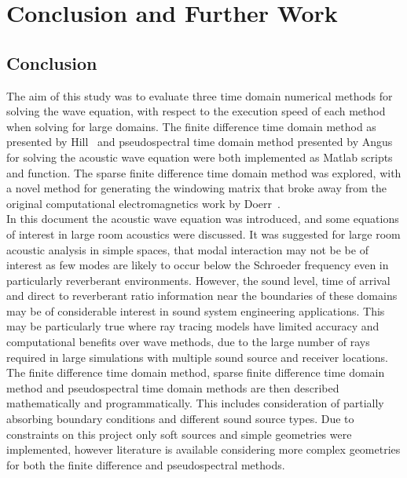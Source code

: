 %
%
%
\chapter{Conclusion and Further Work}
\section{Conclusion}
The aim of this study was to evaluate three time domain numerical methods for solving the wave equation, with respect to the execution speed of each method when solving for large domains. The finite difference time domain method as presented by Hill~\cite{Hill2012} and pseudospectral time domain method presented by Angus~\cite{Angus2010} for solving the acoustic wave equation were both implemented as Matlab scripts and function. The sparse finite difference time domain method was explored, with a novel method for generating the windowing matrix that broke away from the original computational electromagnetics work by Doerr~\cite{Doerr2013}.\\

In this document the acoustic wave equation was introduced, and some equations of interest in large room acoustics were discussed. It was suggested for large room acoustic analysis in simple spaces, that modal interaction may not be be of interest as few modes are likely to occur below the Schroeder frequency even in particularly reverberant environments. However, the sound level, time of arrival and direct to reverberant ratio information near the boundaries of these domains may be of considerable interest in sound system engineering applications. This may be particularly true where ray tracing models have limited accuracy and computational benefits over wave methods, due to the large number of rays required in large simulations with multiple sound source and receiver locations.\\

The finite difference time domain method, sparse finite difference time domain method and pseudospectral time domain methods are then described mathematically and programmatically. This includes consideration of partially absorbing boundary conditions and different sound source types. Due to constraints on this project only soft sources and simple geometries were implemented, however literature is available considering more complex geometries for both the finite difference and pseudospectral methods. \\


